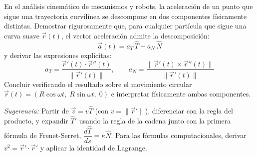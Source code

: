 En el análisis cinemático de mecanismos y robots, la aceleración de un punto que sigue una trayectoria curvilínea se descompone en dos componentes físicamente distintas. Demostrar rigurosamente que, para cualquier partícula que sigue una curva suave $\vec{r}(t)$, el vector aceleración admite la descomposición:
\[ \vec{a}(t) = a_T\,\hat{T} + a_N\,\hat{N} \]
y derivar las expresiones explícitas:
\[ a_T = \frac{\vec{r}'(t)\cdot\vec{r}''(t)}{\|\vec{r}'(t)\|}, \qquad a_N = \frac{\|\vec{r}'(t)\times\vec{r}''(t)\|}{\|\vec{r}'(t)\|} \]
Concluir verificando el resultado sobre el movimiento circular $\vec{r}(t) = (R\cos\omega t,\; R\sin\omega t,\; 0)$ e interpretar físicamente ambas componentes.

\textit{Sugerencia:} Partir de $\vec{v} = v\hat{T}$ (con $v = \|\vec{r}'\|$), diferenciar con la regla del producto, y expandir $\hat{T}'$ usando la regla de la cadena junto con la primera fórmula de Frenet-Serret, $\dfrac{d\hat{T}}{ds} = \kappa\hat{N}$. Para las fórmulas computacionales, derivar $v^2 = \vec{r}'\cdot\vec{r}'$ y aplicar la identidad de Lagrange.